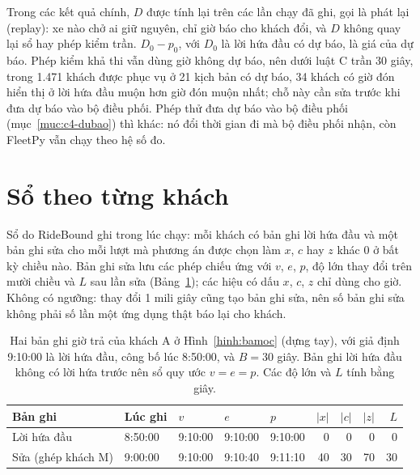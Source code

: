 Trong các kết quả chính, $D$ được tính lại trên các lần chạy đã ghi, gọi là phát lại (replay): xe nào chở ai giữ
nguyên, chỉ giờ báo cho khách đổi, và $D$ không quay lại sổ hay phép kiểm trần. $D_0 - p_0$, với $D_0$ là lời hứa
đầu có dự báo, là giá của dự báo. Phép kiểm khả thi vẫn dùng giờ không dự báo, nên dưới luật C trần 30 giây, trong
1.471 khách được phục vụ ở 21 kịch bản có dự báo, 34 khách có giờ đón hiển thị ở lời hứa đầu muộn hơn giờ đón
muộn nhất; chỗ này cần sửa trước khi đưa dự báo vào bộ điều phối. Phép thử đưa dự báo vào bộ điều phối
(mục~\ref{muc:c4-dubao}) thì khác: nó đổi thời gian đi mà bộ điều phối nhận, còn FleetPy vẫn chạy theo hệ số đo.

\section{Sổ theo từng khách}
\label{muc:so}

Sổ do RideBound ghi trong lúc chạy: mỗi khách có bản ghi lời hứa đầu và một bản ghi sửa cho mỗi lượt mà phương án
được chọn làm $x$, $c$ hay $z$ khác 0 ở bất kỳ chiều nào. Bản ghi sửa lưu các phép chiếu ứng với $v$, $e$, $p$,
độ lớn thay đổi trên mười chiều và $L$ sau lần sửa (Bảng~\ref{bang:vidu-so}); các hiệu có dấu $x$, $c$, $z$ chỉ dùng
cho giờ. Không có ngưỡng: thay đổi 1 mili giây cũng tạo bản ghi sửa, nên số bản ghi sửa không phải số lần một ứng
dụng thật báo lại cho khách.

\begin{table}[htbp]
\centering
\caption{Hai bản ghi giờ trả của khách A ở Hình~\ref{hinh:bamoc} (dựng tay), với giả định 9:10:00 là lời hứa đầu,
công bố lúc 8:50:00, và $B = 30$ giây. Bản ghi lời hứa đầu không có lời hứa trước nên sổ quy ước $v = e = p$. Các
độ lớn và $L$ tính bằng giây.}
\label{bang:vidu-so}
\small
\begin{tabular}{@{}lllllrrrr@{}}
\toprule
\textbf{Bản ghi} & \textbf{Lúc ghi} & $v$ & $e$ & $p$ & $|x|$ & $|c|$ & $|z|$ & $L$\\
\midrule
Lời hứa đầu & 8:50:00 & 9:10:00 & 9:10:00 & 9:10:00 & 0 & 0 & 0 & 0\\
Sửa (ghép khách M) & 9:00:00 & 9:10:00 & 9:10:40 & 9:11:10 & 40 & 30 & 70 & 30\\
\bottomrule
\end{tabular}
\end{table}

